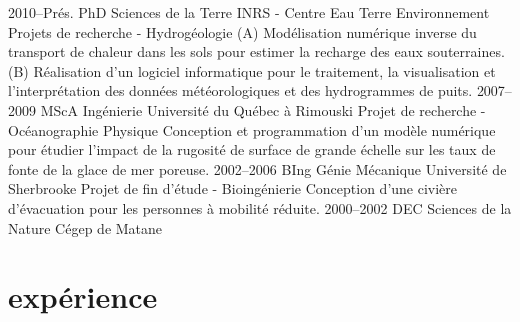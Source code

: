 \documentclass[]{friggos-cv} %
\begin{document}
\begin{entrylist}
\entryMod
{2010--Prés.}
{PhD {\normalfont Sciences de la Terre}}
{INRS - Centre Eau Terre Environnement}
{Projets de recherche - Hydrogéologie}
{(A) Modélisation numérique inverse du transport de chaleur dans les sols pour estimer la recharge des eaux souterraines. (B) Réalisation d'un logiciel informatique pour le traitement, la visualisation et l'interprétation des données météorologiques et des hydrogrammes de puits.}
\entryMod
{2007--2009}
{MScA {\normalfont Ingénierie}}
{Université du Québec à Rimouski}
{Projet de recherche - Océanographie Physique}
{Conception et programmation d'un modèle numérique pour étudier l'impact de la rugosité de surface de grande échelle sur les taux de fonte de la glace de mer poreuse.}
\entryMod
{2002--2006}
{BIng {\normalfont Génie Mécanique}}
{Université de Sherbrooke}
{Projet de fin d'étude - Bioingénierie}
{Conception d'une civière d'évacuation pour les personnes à mobilité réduite.}
\entryAlt
{2000--2002}
{DEC {\normalfont Sciences de la Nature}}
{Cégep de Matane}
\end{entrylist}


\section{expérience}
\end{document}
